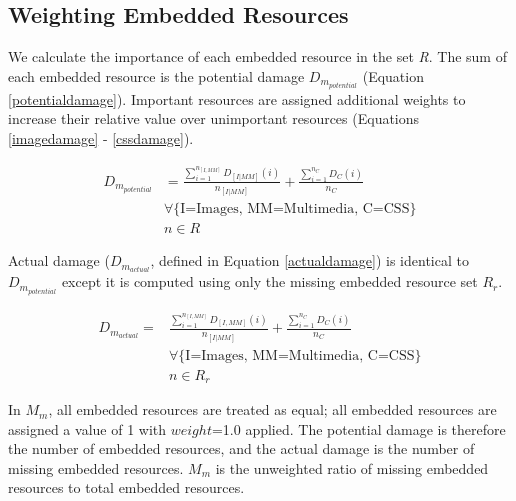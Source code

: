 \subsection{Weighting Embedded Resources}
We calculate the importance of each embedded resource in the set \emph{R}. The sum of each embedded resource is the potential damage \emph{$D_{m_{potential}}$} (Equation \ref{potentialdamage}). Important resources are assigned additional weights to increase their relative value over unimportant resources (Equations \ref{imagedamage} - \ref{cssdamage}).

\begin{equation}
\label{potentialdamage}
\begin{split}
D_{m_{potential}}& = \frac{\sum_{i=1}^{n_{[I,MM]}} D_{[I|MM]}(i)}{n_{[I|MM]}} +\frac{\sum_{i=1}^{n_C} D_C(i)}{n_C} %
\\&\forall\{\text{I=Images, MM=Multimedia, C=CSS}\}\\& n \in R
\end{split}
\end{equation}

Actual damage ($D_{m_{actual}}$, defined in Equation \ref{actualdamage}) is identical to $D_{m_{potential}}$ except it is computed using only the missing embedded resource set \emph{$R_r$}. %

\begin{equation}
\label{actualdamage}
\begin{split}
D_{m_{actual}} =& \frac{\sum_{i=1}^{n_{[I,MM]}} D_{[I,MM]}(i)}{n_{[I|MM]}} + \frac{\sum_{i=1}^{n_C} D_C(i)}{n_C} %
\\&\forall\{\text{I=Images, MM=Multimedia, C=CSS}\} \\&n \in R_r
\end{split}
\end{equation}


In $M_m$, all embedded resources are treated as equal; all embedded resources are assigned a value of 1 with $weight$=1.0 applied. The potential damage is therefore the number of embedded resources, and the actual damage is the number of missing embedded resources. $M_m$ is the unweighted ratio of missing embedded resources to total embedded resources.

